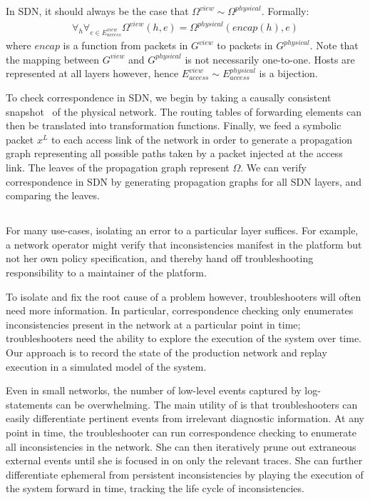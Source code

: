 In SDN, it should always be the case that 
$\Omega^{view} \sim \Omega^{physical}$. 
Formally:
\begin{align*}
\forall_{h} \forall_{e \in E_{access}^{view}} \Omega^{view}(h,e) =
\Omega^{physical}(encap(h),e) 
\end{align*}
where $encap$ is a function from packets in $G^{view}$ to packets in
$G^{physical}$. Note that the mapping between $G^{view}$ and $G^{physical}$ is not
necessarily one-to-one. Hosts are represented at all layers however, hence
$E_{access}^{view} \sim E_{access}^{physical}$ is a bijection.

To check correspondence in SDN, we begin by taking a causally consistent
snapshot~\cite{Chandy:1985:DSD:214451.214456} of the physical network. The routing
tables of forwarding elements can then be translated into transformation functions.
Finally, we feed a symbolic packet $x^L$ to each access link of the network in
order to generate
a propagation graph representing all possible paths taken by a packet injected
at the access link. The leaves of the propagation graph represent $\Omega$. We
can verify correspondence in SDN by generating propagation graphs for all SDN layers,
and comparing the leaves.

\subsection{\SIMULATOR{}}

For many use-cases, isolating an error to a particular layer suffices.
For example, a network operator might verify that inconsistencies manifest in
the platform but not her own policy specification, and thereby hand off
troubleshooting responsibility to a maintainer of the platform. 

To isolate and fix the root cause of a problem however, troubleshooters will often
need more information. In particular, correspondence checking only enumerates
inconsistencies present in the network at a particular point in time;
troubleshooters need the ability to explore the execution of the system over
time. Our approach is to record the state of the production network and replay 
execution in a simulated model of the system.

Even in small networks,
the number of low-level events captured by
log-statements can be overwhelming. The main utility of \simulator is that
troubleshooters can easily differentiate pertinent events from
irrelevant diagnostic information. At any point in time, the troubleshooter
can run correspondence checking to enumerate all inconsistencies in the
network. She can then iteratively prune out extraneous external events until
she is focused in on only the relevant traces. She can further differentiate
ephemeral from persistent inconsistencies by playing the execution of the
system forward in time, tracking the life cycle of inconsistencies.

